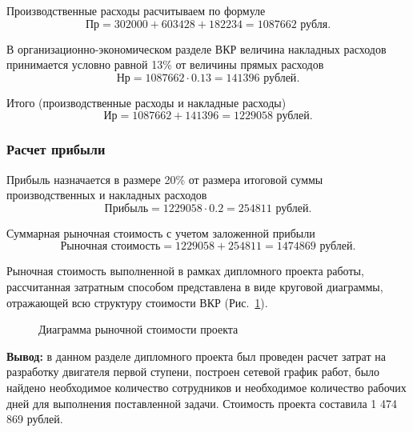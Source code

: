Производственные расходы расчитываем по формуле
\begin{equation}
	\text{Пр} = 302000 + 603428 + 182234 = 1087662 \text{ рубля}.
\end{equation}

В организационно-экономическом разделе ВКР величина
накладных расходов принимается условно равной 13\% от
величины прямых расходов
\begin{equation}
	\text{Нр} = 1087662 \cdot 0.13 = 141396 \text{ рублей}.
\end{equation}

Итого (производственные расходы и накладные расходы)
\begin{equation}
	\text{Ир} = 1087662 + 141396 = 1229058 \text{ рублей}.
\end{equation}

\subsubsection{Расчет прибыли}\label{sec:Расчет прибыли} %

Прибыль назначается в размере 20\% от размера итоговой суммы
производственных и накладных расходов
\begin{equation}
	\text{Прибыль} = 1229058 \cdot 0.2 = 254811 \text{ рублей}.
\end{equation}

Суммарная рыночная стоимость с учетом заложенной прибыли
\begin{equation}
	\text{Рыночная стоимость} = 1229058 + 254811 = 1474869 \text{ рублей}.
\end{equation}

Рыночная стоимость выполненной в рамках дипломного проекта
работы, рассчитанная затратным способом представлена в виде
круговой диаграммы, отражающей всю структуру стоимости ВКР
(Рис.~\ref{fig:project-market-value-chart}).

\begin{figure}[t]
	\centering
	\caption{Диаграмма рыночной стоимости проекта}\label{fig:project-market-value-chart}
\end{figure}

\textbf{Вывод:} в данном разделе дипломного проекта был
проведен расчет затрат на разработку двигателя первой
ступени, построен сетевой график работ, было найдено
необходимое количество сотрудников и необходимое количество
рабочих дней для выполнения поставленной задачи. Стоимость
проекта составила 1 474 869 рублей.

